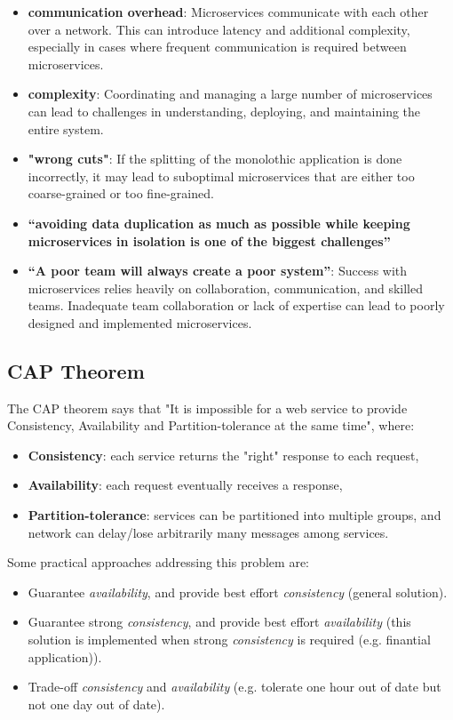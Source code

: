 \begin{itemize}
   \item \textbf{communication overhead}: Microservices communicate with each other over a network. This can introduce latency and additional complexity, especially in cases where frequent communication is required between microservices.
   \item \textbf{complexity}: Coordinating and managing a large number of microservices can lead to challenges in understanding, deploying, and maintaining the entire system.
   \item \textbf{"wrong cuts"}: If the splitting of the monolothic application is done incorrectly, it may lead to suboptimal microservices that are either too coarse-grained or too fine-grained.
   \item \textbf{“avoiding data duplication as much as possible while keeping microservices in isolation is one of the biggest challenges”}
   \item \textbf{“A poor team will always create a poor system”}: Success with microservices relies heavily on collaboration, communication, and skilled teams. Inadequate team collaboration or lack of expertise can lead to poorly designed and implemented microservices.
\end{itemize}

\subsection{CAP Theorem}
The CAP theorem says that "It is impossible for a web service to provide Consistency, Availability and Partition-tolerance at the same time", where:
\begin{itemize}
   \item \textbf{Consistency}: each service returns the "right" response to each request,
   \item \textbf{Availability}: each request eventually receives a response,
   \item \textbf{Partition-tolerance}: services can be partitioned into multiple groups, and network can delay/lose arbitrarily many messages among services.
\end{itemize}
\noindent Some practical approaches addressing this problem are:
\begin{itemize}
    \item Guarantee \textit{availability}, and provide best effort \textit{consistency} (general solution).
    \item Guarantee strong \textit{consistency}, and provide best effort \textit{availability} (this solution is implemented when strong \textit{consistency} is required (e.g. finantial application)).
    \item  Trade-off \textit{consistency} and \textit{availability} (e.g. tolerate one hour out of date but not one day out of date).
\end{itemize}
